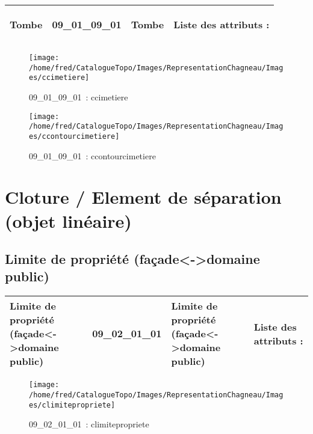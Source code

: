 \documentclass[12pt,titlepage]{book}
\begin{document}
\renewcommand{\arraystretch}{1.2}
\begin{supertabular}{|p{10cm}|c|p{13cm}|p{12cm}|}
 Tombe & 09\_01\_09\_01 & Tombe & Liste des attributs :
\begin{enumerate}
\end{enumerate}
\\
\hline
\end{supertabular}
\begin{figure}[h!]
  \hfill         %
  \begin{minipage}[t]{3cm}
    \begin{center}
      \texttt{[image: /home/fred/CatalogueTopo/Images/RepresentationChagneau/Images/ccimetiere]}
      \caption[~09\_01\_09\_01]{\small{09\_01\_09\_01~:} \tiny{ccimetiere}}\label{ccimetiere}
    \end{center}
  \end{minipage}
  \begin{minipage}[t]{3cm}
    \begin{center}
      \texttt{[image: /home/fred/CatalogueTopo/Images/RepresentationChagneau/Images/ccontourcimetiere]}
      \caption[~09\_01\_09\_01]{\small{09\_01\_09\_01~:} \tiny{ccontourcimetiere}}\label{ccontourcimetiere}
    \end{center}
  \end{minipage}
\end{figure}

\section{\large Cloture / Element de séparation (objet linéaire)}
\subsection{Limite de propriété (façade<->domaine public)}
\noindent
\vspace{\baselineskip}

\renewcommand{\arraystretch}{1.2}
\begin{supertabular}{|p{10cm}|c|p{13cm}|p{12cm}|}
 Limite de propriété (façade<->domaine public) & 09\_02\_01\_01 & Limite de propriété (façade<->domaine public) & Liste des attributs :
\begin{enumerate}
\end{enumerate}
\\
\hline
\end{supertabular}
\begin{figure}[h!]
  \hfill         %
  \begin{minipage}[t]{3cm}
    \begin{center}
      \texttt{[image: /home/fred/CatalogueTopo/Images/RepresentationChagneau/Images/climitepropriete]}
      \caption[~09\_02\_01\_01]{\small{09\_02\_01\_01~:} \tiny{climitepropriete}}\label{climitepropriete}
    \end{center}
  \end{minipage}
\end{figure}
\end{document}
